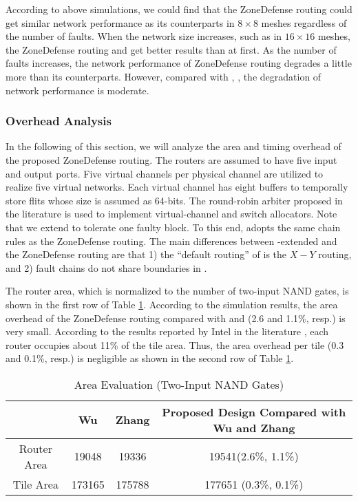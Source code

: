 According to above simulations, we could find that the ZoneDefense routing could get similar network performance as its counterparts in $8 \times 8$ meshes regardless of the number of faults. When the network size increases, such as in $16 \times 16$ meshes, the ZoneDefense routing and \cite{zhang2008reconfigurable} get better results than \cite{wu2003fault} at first. As the number of faults increases, the network performance of ZoneDefense routing degrades a little more than its counterparts. However, compared with \cite{wu2003fault}, \cite{zhang2008reconfigurable}, the degradation of network performance is moderate.

\subsubsection{Overhead Analysis}
In the following of this section, we will analyze the area and timing overhead of the proposed ZoneDefense routing. The routers are assumed to have five input and output ports. Five virtual channels per physical channel are utilized to realize five virtual networks. Each virtual channel has eight buffers to temporally store flits whose size is assumed as 64-bits. The round-robin arbiter proposed in the literature \cite{shin2002round} is used to implement virtual-channel and switch allocators. Note that we extend \cite{zhang2008reconfigurable} to tolerate one faulty block. To this end, \cite{zhang2008reconfigurable} adopts the same chain rules as the ZoneDefense routing. The main differences between \cite{zhang2008reconfigurable}-extended and the ZoneDefense routing are that 1) the “default routing” of \cite{zhang2008reconfigurable} is the $X-Y$ routing, and 2) fault chains do not share boundaries in \cite{zhang2008reconfigurable}.

The router area, which is normalized to the number of two-input NAND gates, is shown in the first row of Table \ref{tab:area-eval}. According to the simulation results, the area overhead of the ZoneDefense routing compared with \cite{wu2003fault} and \cite{zhang2008reconfigurable} (2.6 and 1.1\%, resp.) is very small. According to the results reported by Intel in the literature \cite{vangal200880}, each router occupies about 11\% of the tile area. Thus, the area overhead per tile (0.3 and 0.1\%, resp.) is negligible as shown in the second row of Table \ref{tab:area-eval}.

\begin{table}[h]
    \caption{Area Evaluation (Two-Input NAND Gates)}
    \begin{tabular}{|c|c|c|c|} 
        \hline
        & Wu \cite{wu2003fault}  & Zhang \cite{zhang2008reconfigurable} & Proposed Design Compared with Wu \cite{wu2003fault} and Zhang \cite{zhang2008reconfigurable} \\ \hline
                    Router Area & 19048  & 19336    & 19541(2.6\%, 1.1\%)   \\ \hline
                    Tile Area   & 173165 & 175788   & 177651 (0.3\%, 0.1\%) \\ \hline                         
    \end{tabular}
    \label{tab:area-eval}
\end{table}

